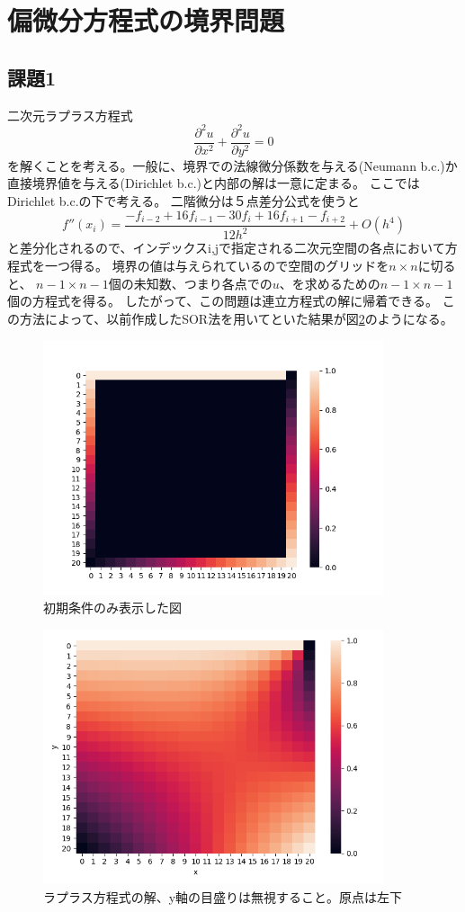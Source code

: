 \documentclass{jsarticle}
\begin{document}
\section{偏微分方程式の境界問題}
\subsection{課題1}
二次元ラプラス方程式
\begin{equation}
    \frac{\partial^2u}{\partial x^2} +     \frac{\partial^2u}{\partial y^2} = 0
\end{equation}
を解くことを考える。一般に、境界での法線微分係数を与える(Neumann b.c.)か直接境界値を与える(Dirichlet b.c.)と内部の解は一意に定まる。
ここではDirichlet b.c.の下で考える。
二階微分は５点差分公式を使うと
\begin{equation}
    f''(x_i) = \frac{-f_{i-2}+16f_{i-1}-30f_{i}+16f_{i+1}-f_{i+2}}{12h^2} + O(h^4)
\end{equation}
と差分化されるので、インデックスi,jで指定される二次元空間の各点において方程式を一つ得る。
境界の値は与えられているので空間のグリッドを$n\times n$に切ると、
$n-1 \times n-1$個の未知数、つまり各点での$u$、を求めるための$n-1 \times n-1$個の方程式を得る。
したがって、この問題は連立方程式の解に帰着できる。
この方法によって、以前作成したSOR法を用いてといた結果が図\ref{fig:5}のようになる。
\begin{figure}[htbp]
    \includegraphics[clip,width=10.0cm]{./init.png}
    \caption{初期条件のみ表示した図}
    \label{fig:4}
\end{figure}
\begin{figure}[htbp]
    \includegraphics[clip,width=10.0cm]{./pde.png}
    \caption{ラプラス方程式の解、y軸の目盛りは無視すること。原点は左下}
    \label{fig:5}
\end{figure}
\end{document}
